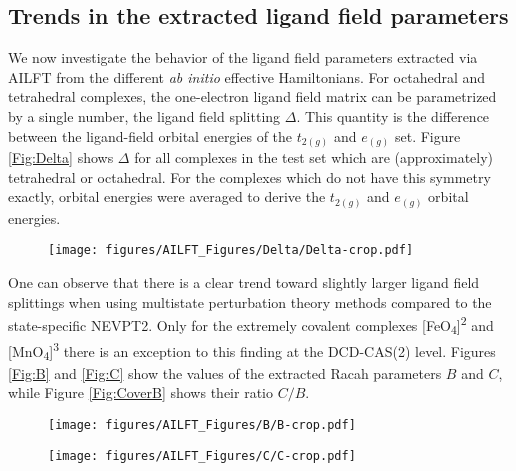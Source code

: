 \subsection{Trends in the extracted ligand field parameters}
We now investigate the behavior of the ligand field parameters extracted via AILFT from the different \textit{ab initio} effective Hamiltonians. For octahedral and tetrahedral complexes, the one-electron ligand field matrix can be parametrized by a single number, the ligand field splitting $\Delta$. This quantity is the difference between the ligand-field orbital energies of the $t_{2(g)}$ and $e_{(g)}$ set. Figure \ref{Fig:Delta} shows $\Delta$ for all complexes in the test set which are (approximately) tetrahedral or octahedral. For the complexes which do not have this symmetry exactly, orbital energies were averaged to derive the $t_{2(g)}$ and $e_{(g)}$ orbital energies.
 \begin{figure}
{\texttt{[image: figures/AILFT\_Figures/Delta/Delta-crop.pdf]}}
\end{figure}
One can observe that there is a clear trend toward slightly larger ligand field splittings when using multistate perturbation theory methods compared to the state-specific NEVPT2. Only for the extremely covalent complexes [FeO\textsubscript{4}]\textsuperscript{2\textminus} and [MnO\textsubscript{4}]\textsuperscript{3\textminus} there is an exception to this finding at the DCD-CAS(2) level. Figures \ref{Fig:B} and \ref{Fig:C} show the values of the extracted Racah parameters $B$ and $C$, while Figure \ref{Fig:CoverB} shows their ratio $C/B$.
 \begin{figure}
{\texttt{[image: figures/AILFT\_Figures/B/B-crop.pdf]}}
\end{figure}
 \begin{figure}
{\texttt{[image: figures/AILFT\_Figures/C/C-crop.pdf]}}
\end{figure}

